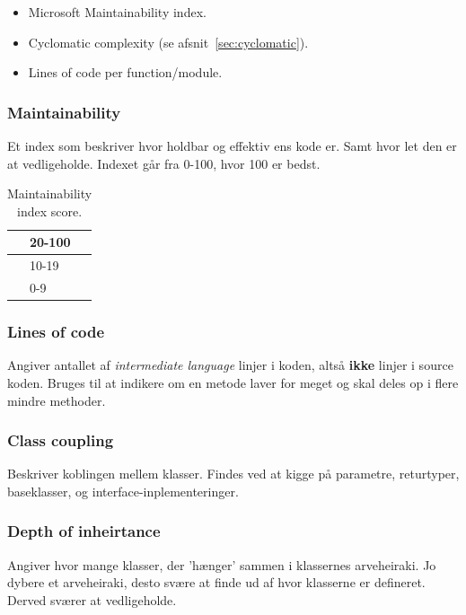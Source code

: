 \begin{itemize}
	\item Microsoft Maintainability index.
	\item Cyclomatic complexity (se afsnit~\ref{sec:cyclomatic}).
	\item Lines of code per function/module.
\end{itemize}

\subsubsection{Maintainability}
Et index som beskriver hvor holdbar og effektiv ens kode er. Samt hvor let den er at vedligeholde. Indexet går fra 0-100, hvor 100 er bedst.

\def\arraystretch{1.5}%
\begin{table}[H]
	\centering
	\begin{tabular}{|c|l|}
		\hline
		\hspace{2cm} \cellcolor{green}& 20-100\\
		\hline
		\cellcolor{yellow}& 10-19\\
		\hline
		\cellcolor{red}& 0-9\\
		\hline
	\end{tabular}
	\caption{Maintainability index score.}
\end{table}

\subsubsection{Lines of code}
Angiver antallet af \textit{intermediate language} linjer i koden, altså \textbf{ikke} linjer i source koden. Bruges til at indikere om en metode laver for meget og skal deles op i flere mindre methoder.

\subsubsection{Class coupling}
Beskriver koblingen mellem klasser. Findes ved at kigge på parametre, returtyper, baseklasser, og interface-inplementeringer.

\subsubsection{Depth of inheirtance}
Angiver hvor mange klasser, der 'hænger' sammen i klassernes arveheiraki. Jo dybere et arveheiraki, desto svære at finde ud af hvor klasserne er defineret. Derved sværer at vedligeholde.

